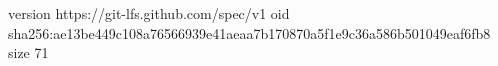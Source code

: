 version https://git-lfs.github.com/spec/v1
oid sha256:ae13be449c108a76566939e41aeaa7b170870a5f1e9c36a586b501049eaf6fb8
size 71
